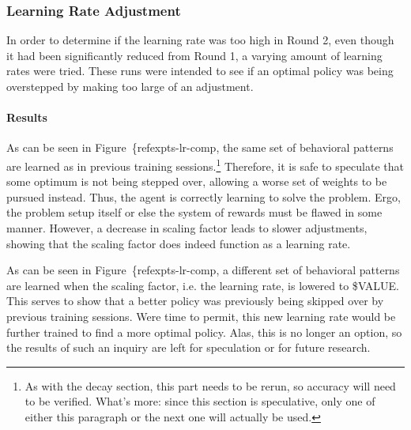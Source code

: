 
\subsubsection*{Learning Rate Adjustment}
\label{sec:findings-expts-learnrate}

In order to determine if the learning rate was too high in Round 2,
even though it had been significantly reduced from Round 1,
a varying amount of learning rates were tried.
%
These runs were intended to see if an optimal policy was being overstepped by
making too large of an adjustment.


\paragraph*{Results}




As can be seen in Figure~\{ref{expts-lr-comp},
the same set of behavioral patterns are learned as in previous training
sessions.\footnote{
	As with the decay section,
	this part needs to be rerun,
	so accuracy will need to be verified.
	What's more: since this section is speculative,
	only one of either this paragraph or the next one will actually be used.
}
%
Therefore,
it is safe to speculate that some optimum is not being stepped over,
allowing a worse set of weights to be pursued instead.
%
Thus,
the agent is correctly learning to solve the problem.
%
Ergo,
the problem setup itself or else the system of rewards
must be flawed in some manner.
%
However,
a decrease in scaling factor leads to slower adjustments,
showing that the scaling factor does indeed function as a learning rate.


As can be seen in Figure~\{ref{expts-lr-comp},
a different set of behavioral patterns are learned when the
scaling factor,
i.e. the learning rate,
is lowered to \${VALUE}. %
%
This serves to show that a better policy was previously being skipped over
by previous training sessions.
%
Were time to permit,
this new learning rate would be further trained to find a more optimal
policy.
%
Alas, this is no longer an option,
so the results of such an inquiry are left for speculation
or for future research.



